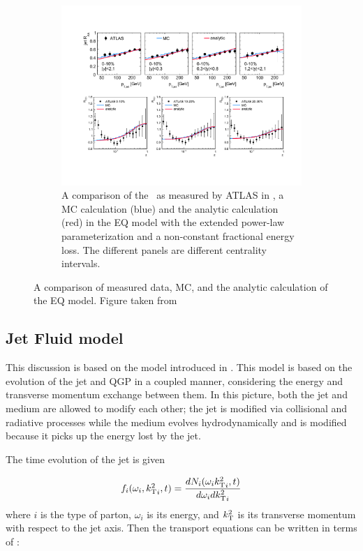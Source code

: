 \begin{figure}
\begin{subfigure}{1\textwidth}
\includegraphics[width=1\textwidth]{figures/jetMeasurements/eq_FF}
\caption{A comparison of the \Rdz\ as measured by ATLAS in \cite{Aad:2014wha}, a MC calculation (blue) and the analytic calculation (red) in the EQ model with the extended power-law parameterization and a non-constant fractional energy loss. The different panels are different centrality intervals.}
\label{fig:EQ_FF}
\end{subfigure}
\caption{A comparison of measured data, MC, and the analytic calculation of the EQ model. Figure taken from \cite{Spousta:2015fca}}
\label{fig:EQ_modification}
\end{figure}




\subsection{Jet Fluid model}
This discussion is based on the model introduced in \cite{Tachibana:2017syd}. This model is based on the evolution of the jet and QGP in a coupled manner, considering the energy and transverse momentum exchange between them. In this picture, both the jet and medium are allowed to modify each other; the jet is modified via collisional and radiative processes while the medium evolves hydrodynamically and is modified because it picks up the energy lost by the jet. 

The time evolution of the jet is given 

\begin{align}
f_i (\omega_i, \mbox{$k_{\rm T}^2$}_i, t) = \frac{dN_i (\omega_i \mbox{$k_{\rm T}^2$}_i, t)}{d \omega_i d\mbox{$k_{\rm T}^2$}_i}
\end{align}
where $i$ is the type of parton, $\omega_i$ is its energy, and $\mbox{$k_{\rm T}^2$}$ is its transverse momentum with respect to the jet axis. Then the transport equations can be written in terms of :

